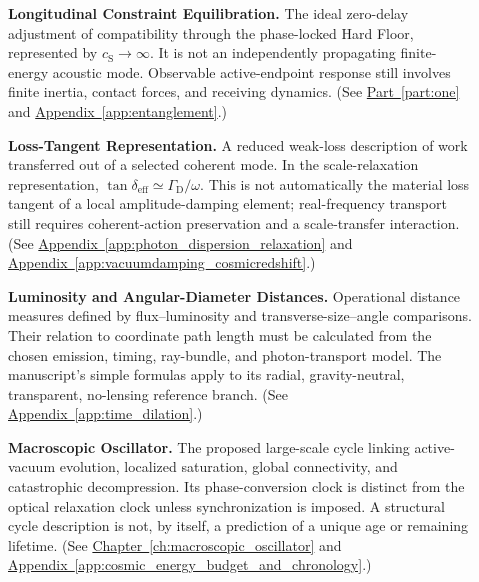 \begin{description}
\item[] \begin{minipage}[t]{\linewidth}
\textbf{Longitudinal Constraint Equilibration.} The ideal zero-delay adjustment of compatibility through the phase-locked Hard Floor, represented by $c_{\mathrm S}\to\infty$. It is not an independently propagating finite-energy acoustic mode. Observable active-endpoint response still involves finite inertia, contact forces, and receiving dynamics.
(See \hyperref[part:one]{Part~\ref*{part:one}} and \hyperref[app:entanglement]{Appendix~\ref*{app:entanglement}}.)
\end{minipage}

\item[] \begin{minipage}[t]{\linewidth}
\textbf{Loss-Tangent Representation.} A reduced weak-loss description of work transferred out of a selected coherent mode. In the scale-relaxation representation, $\tan\delta_{\mathrm{eff}}\simeq\Gamma_{\mathrm D}/\omega$. This is not automatically the material loss tangent of a local amplitude-damping element; real-frequency transport still requires coherent-action preservation and a scale-transfer interaction.
(See \hyperref[app:photon_dispersion_relaxation]{Appendix~\ref*{app:photon_dispersion_relaxation}} and \hyperref[app:vacuumdamping_cosmicredshift]{Appendix~\ref*{app:vacuumdamping_cosmicredshift}}.)
\end{minipage}

\item[] \begin{minipage}[t]{\linewidth}
\textbf{Luminosity and Angular-Diameter Distances.} Operational distance measures defined by flux--luminosity and transverse-size--angle comparisons. Their relation to coordinate path length must be calculated from the chosen emission, timing, ray-bundle, and photon-transport model. The manuscript's simple formulas apply to its radial, gravity-neutral, transparent, no-lensing reference branch.
(See \hyperref[app:time_dilation]{Appendix~\ref*{app:time_dilation}}.)
\end{minipage}

\item[] \begin{minipage}[t]{\linewidth}
\textbf{Macroscopic Oscillator.} The proposed large-scale cycle linking active-vacuum evolution, localized saturation, global connectivity, and catastrophic decompression. Its phase-conversion clock is distinct from the optical relaxation clock unless synchronization is imposed. A structural cycle description is not, by itself, a prediction of a unique age or remaining lifetime.
(See \hyperref[ch:macroscopic_oscillator]{Chapter~\ref*{ch:macroscopic_oscillator}} and \hyperref[app:cosmic_energy_budget_and_chronology]{Appendix~\ref*{app:cosmic_energy_budget_and_chronology}}.)
\end{minipage}


\end{description}
